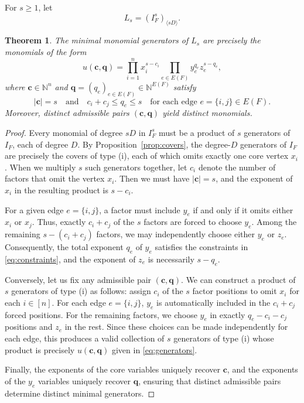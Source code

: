 \documentclass[12pt]{amsart}
\newtheorem{theorem}{Theorem}[section]
\theoremstyle{definition}
\theoremstyle{remark}
\newcommand{\bc}{\mathbf c}
\newcommand{\bq}{\mathbf q}
\begin{document}
For $s \ge 1$, let
\[
L_s = (I_F^s)_{\langle sD \rangle}.
\]

\begin{theorem}\label{thm:generators}
The minimal monomial generators of $L_s$ are precisely the monomials of the form
\begin{equation}\label{eq:generators}
u(\bc, \bq) = \prod_{i=1}^n x_i^{s - c_i} \prod_{e \in E(F)} y_e^{q_e} z_e^{s - q_e},
\end{equation}
where $\bc \in \mathbb{N}^n$ and $\bq = (q_e)_{e \in E(F)} \in \mathbb{N}^{E(F)}$ satisfy
\begin{equation}\label{eq:constraints}
|\bc| = s \quad \text{and} \quad c_i + c_j \le q_e \le s \quad \text{for each edge } e = \{i, j\} \in E(F).
\end{equation}
Moreover, distinct admissible pairs $(\bc, \bq)$ yield distinct monomials.
\end{theorem}

\begin{proof}
Every monomial of degree $sD$ in $I_F^s$ must be a product of $s$ generators of $I_F$, each of degree $D$. By Proposition~\ref{prop:covers}, the degree-$D$ generators of $I_F$ are precisely the covers of type (i), each of which omits exactly one core vertex $x_i$. When we multiply $s$ such generators together, let $c_i$ denote the number of factors that omit the vertex $x_i$. Then we must have $|\bc| = s$, and the exponent of $x_i$ in the resulting product is $s - c_i$. 

For a given edge $e = \{i, j\}$, a factor must include $y_e$ if and only if it omits either $x_i$ or $x_j$. Thus, exactly $c_i + c_j$ of the $s$ factors are forced to choose $y_e$. Among the remaining $s - (c_i + c_j)$ factors, we may independently choose either $y_e$ or $z_e$. Consequently, the total exponent $q_e$ of $y_e$ satisfies the constraints in \eqref{eq:constraints}, and the exponent of $z_e$ is necessarily $s - q_e$.

Conversely, let us fix any admissible pair $(\bc, \bq)$. We can construct a product of $s$ generators of type (i) as follows: assign $c_i$ of the $s$ factor positions to omit $x_i$ for each $i \in [n]$. For each edge $e = \{i, j\}$, $y_e$ is automatically included in the $c_i + c_j$ forced positions. For the remaining factors, we choose $y_e$ in exactly $q_e - c_i - c_j$ positions and $z_e$ in the rest. Since these choices can be made independently for each edge, this produces a valid collection of $s$ generators of type (i) whose product is precisely $u(\bc, \bq)$ given in \eqref{eq:generators}.

Finally, the exponents of the core variables uniquely recover $\bc$, and the exponents of the $y_e$ variables uniquely recover $\bq$, ensuring that distinct admissible pairs determine distinct minimal generators.
\end{proof}
\end{document}
